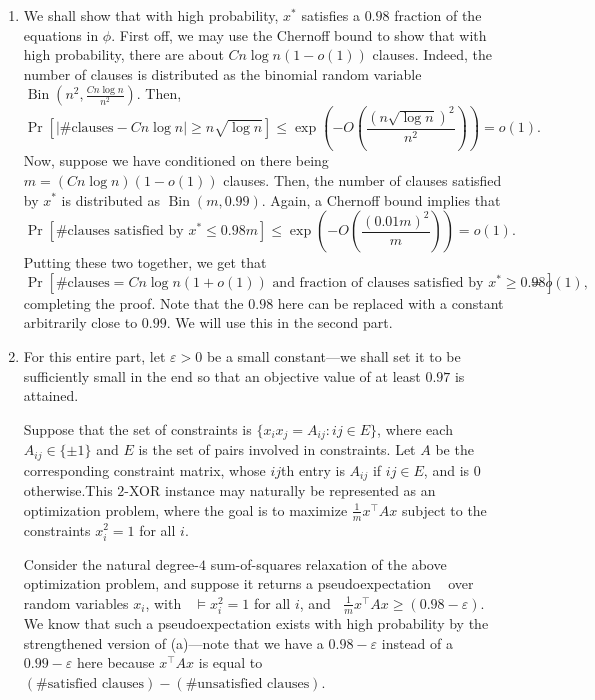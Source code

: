 \documentclass[11pt]{article}
\theoremstyle{definition}
\renewcommand{\epsilon}{\varepsilon}
\newcommand{\eps}{\epsilon}
\DeclareMathOperator{\pE}{\widetilde{\mathbb{E}}} %
\newcommand{\Bin}{\operatorname{Bin}}
\begin{document}
  \begin{enumerate}[label=(\alph*)]
    \item We shall show that with high probability, $x^*$ satisfies a $0.98$ fraction of the equations in $\phi$. First off, we may use the Chernoff bound to show that with high probability, there are about $C n \log n (1-o(1))$ clauses. Indeed, the number of clauses is distributed as the binomial random variable $\Bin(n^2 , \frac{C n \log n}{n^2})$. Then,
    \[ \Pr \left[ \left|\text{\# clauses} - C n \log n \right| \ge n \sqrt{\log n} \right] \le \exp\left( - O\left(\frac{(n \sqrt{\log n})^2}{n^2}\right) \right) = o(1). \]
    Now, suppose we have conditioned on there being $m = (C n \log n)(1-o(1))$ clauses. Then, the number of clauses satisfied by $x^*$ is distributed as $\Bin(m , 0.99)$. Again, a Chernoff bound implies that
    \[ \Pr\left[ \text{\# clauses satisfied by $x^*$} \le 0.98m \right] \le \exp\left( - O \left( \frac{(0.01m)^2}{m} \right) \right) = o(1). \]
    Putting these two together, we get that
    \[ \Pr\left[ \text{\# clauses} = Cn\log n(1+o(1)) \text{ and } \text{fraction of clauses satisfied by $x^*$} \ge 0.98 \right] = o(1), \]
    completing the proof. Note that the $0.98$ here can be replaced with a constant arbitrarily close to $0.99$. We will use this in the second part.

    \item For this entire part, let $\eps > 0$ be a small constant---we shall set it to be sufficiently small in the end so that an objective value of at least $0.97$ is attained.

    Suppose that the set of constraints is $\{x_i x_j = A_{ij} : ij \in E\}$, where each $A_{ij} \in \{\pm 1\}$ and $E$ is the set of pairs involved in constraints. Let $A$ be the corresponding constraint matrix, whose $ij$th entry is $A_{ij}$ if $ij \in E$, and is $0$ otherwise.This $2$-XOR instance may naturally be represented as an optimization problem, where the goal is to maximize $\frac{1}{m} x^\top A x$ subject to the constraints $x_i^2 = 1$ for all $i$.

    Consider the natural degree-$4$ sum-of-squares relaxation of the above optimization problem, and suppose it returns a pseudoexpectation $\pE$ over random variables $x_i$, with $\pE \vDash x_i^2 = 1$ for all $i$, and $\pE \frac{1}{m} x^\top A x \ge (0.98-\eps)$. We know that such a pseudoexpectation exists with high probability by the strengthened version of (a)---note that we have a $0.98-\eps$ instead of a $0.99-\eps$ here because $x^\top A x$ is equal to $(\# \text{satisfied clauses}) - (\# \text{unsatisfied clauses})$.


\end{enumerate}
\end{document}

